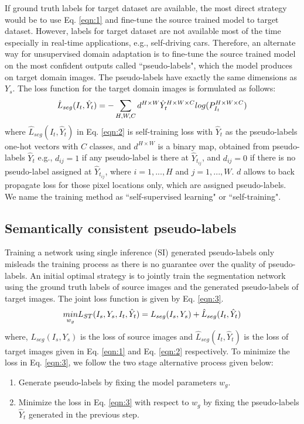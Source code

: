 \documentclass[10pt,twocolumn,letterpaper]{article}
\begin{document}
If ground truth labels for target dataset are available, the most direct strategy would be to use Eq. \ref{eqn:1} and fine-tune the source trained model to target dataset. 
However, labels for target dataset are not available most of the time especially in real-time applications, e.g., self-driving cars. Therefore, an alternate way for unsupervised domain adaptation is to fine-tune the source trained model on the most confident outputs called ``pseudo-labels", which the model produces on target domain images. The pseudo-labels have exactly the same dimensions as $Y_s$. The loss function for the target domain images is formulated as follows:
\begin{equation}
\small
    \hat{L}_{seg} (I_t, \hat{Y}_t) = -\sum_{H, W, C} d^{H\times W} \hat{Y}_t^{H\times W\times C} log(P_{I_t}^{H\times W\times C})
\label{eqn:2}
\end{equation}
where $\hat{L}_{seg} (I_t, \hat{Y}_t)$ in Eq. \ref{eqn:2} is self-training loss with $\hat{Y}_t$ as the pseudo-labels one-hot vectors with $C$ classes, and $d^{H\times W}$ is a binary map, obtained from pseudo-labels $\hat{Y}_t$ e.g., $d_{ij} = 1$ if any pseudo-label is there at $\hat{Y}_{t_{ij}}$, and $d_{ij} = 0$ if there is no pseudo-label assigned at $\hat{Y}_{t_{ij}}$, where $i=1,...,H$ and $j=1,...,W$.  $d$ allows to back propagate loss for those pixel locations only, which are assigned pseudo-labels. We name the training method as ``self-supervised learning" or ``self-training".

\subsection{Semantically consistent pseudo-labels}
\label{sec:sisc}
Training a network using single inference (SI) generated pseudo-labels only misleads the training process as there is no guarantee over the quality of pseudo-labels. An initial optimal strategy is to jointly train the segmentation network using the ground truth labels of source images and the generated pseudo-labels of target images. The joint loss function is given by Eq. \ref{eqn:3}.
\begin{equation}
\small
\underset{w_g} {min} L_{ST} ( I_s, Y_s, I_t, \hat{Y}_t) = L_{seg} (I_s, Y_s) + \hat{L}_{seg} (I_t, \hat{Y}_t)
\label{eqn:3}
\end{equation}
where, $L_{seg} (I_s, Y_s)$ is the loss of source images  and $\hat{L}_{seg} (I_t, \hat{Y}_t)$ is the loss of target images  given in Eq. \ref{eqn:1} and Eq. \ref{eqn:2} respectively. To minimize the loss in Eq. \ref{eqn:3}, we follow the two stage alternative process given below: 
\begin{enumerate}
\item Generate pseudo-labels by fixing the model parameters $w_g$.

\item Minimize the loss in Eq. \ref{eqn:3} with respect to $w_g$ by fixing the pseudo-labels $\hat{Y}_t$ generated in the previous step. 
\end{enumerate}
\end{document}
